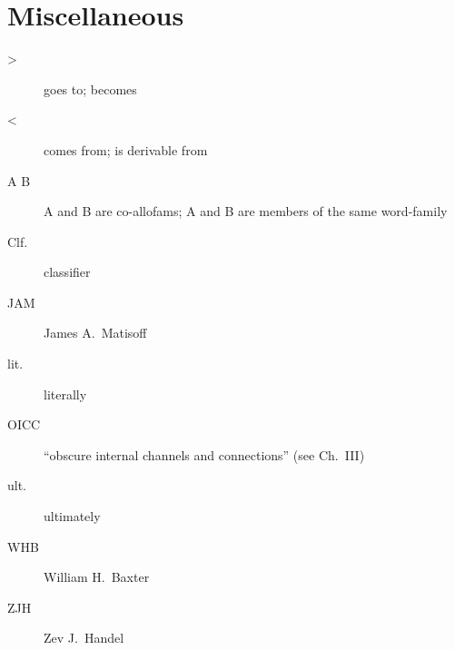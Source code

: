 \section*{Miscellaneous}
\begin{multicols}{2}
\begin{description}
\item[>]	goes to; becomes
\item[<]	comes from; is derivable from
\item[A  B]		A and B are co-allofams; A and B are members of the same word-family
\item[Clf.]	classifier
\item[JAM]	James A.\ Matisoff
\item[lit.]	literally
\item[OICC]	“obscure internal channels and connections” (see Ch.~III)
\item[ult.]	ultimately
\item[WHB]	William H.\ Baxter
\item[ZJH]	Zev J.\ Handel
\end{description}
\end{multicols}

\cleartooddpage[\thispagestyle{empty}]
